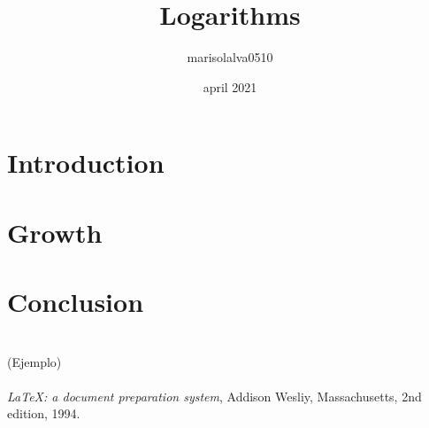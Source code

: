 \documentclass{article}
\title{Logarithms}
\author{marisolalva0510 }
\date{april 2021}
\begin{document}
\maketitle
\section{Introduction}

\section{Growth}

\section{Conclusion}

\begin{thebibliography} 
\\(Ejemplo)
\\\\ %
\textit{\LaTeX: a document preparation system}, Addison Wesliy, Massachusetts, 2nd edition, 1994.
\end{thebibliography}
\end{document}
